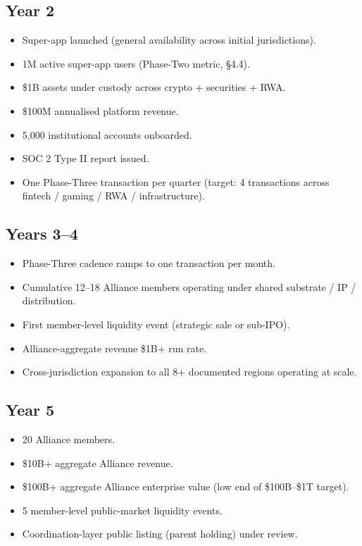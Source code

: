 \subsection{Year 2}

\begin{itemize}[leftmargin=2em,itemsep=0.1em]
\item Super-app launched (general availability across initial
jurisdictions).
\item 1M active super-app users (Phase-Two metric, \S 4.4).
\item \$1B assets under custody across crypto + securities + RWA.
\item \$100M annualised platform revenue.
\item 5,000 institutional accounts onboarded.
\item SOC 2 Type II report issued.
\item One Phase-Three transaction per quarter (target: 4 transactions
across fintech / gaming / RWA / infrastructure).
\end{itemize}

\subsection{Years 3--4}

\begin{itemize}[leftmargin=2em,itemsep=0.1em]
\item Phase-Three cadence ramps to one transaction per month.
\item Cumulative 12--18 Alliance members operating under shared
substrate / IP / distribution.
\item First member-level liquidity event (strategic sale or sub-IPO).
\item Alliance-aggregate revenue \$1B+ run rate.
\item Cross-jurisdiction expansion to all 8+ documented regions
operating at scale.
\end{itemize}

\subsection{Year 5}

\begin{itemize}[leftmargin=2em,itemsep=0.1em]
\item 20 Alliance members.
\item \$10B+ aggregate Alliance revenue.
\item \$100B+ aggregate Alliance enterprise value (low end of
\$100B--\$1T target).
\item 5 member-level public-market liquidity events.
\item Coordination-layer public listing (parent holding) under
review.
\end{itemize}

